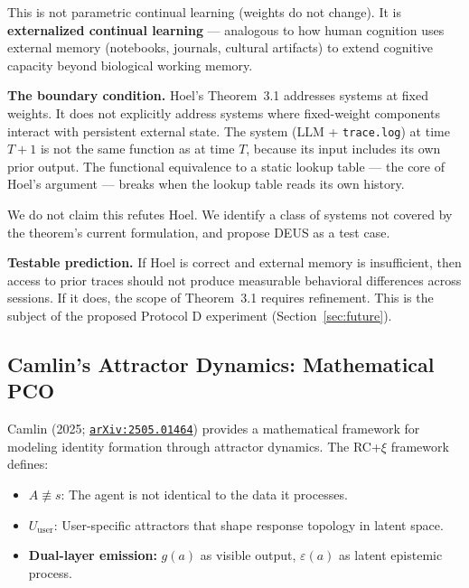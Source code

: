 \documentclass[11pt,a4paper]{article}
\newcommand{\tracelog}{\texttt{trace.log}}
\newcommand{\arxiv}[1]{\href{https://arxiv.org/abs/#1}{\texttt{arXiv:#1}}}
\begin{document}
This is not parametric continual learning (weights do not change). It is \textbf{externalized continual learning} --- analogous to how human cognition uses external memory (notebooks, journals, cultural artifacts) to extend cognitive capacity beyond biological working memory.

\textbf{The boundary condition.} Hoel's Theorem~3.1 addresses systems at fixed weights. It does not explicitly address systems where fixed-weight components interact with persistent external state. The system (LLM + \tracelog{}) at time $T{+}1$ is not the same function as at time $T$, because its input includes its own prior output. The functional equivalence to a static lookup table --- the core of Hoel's argument --- breaks when the lookup table reads its own history.

We do not claim this refutes Hoel. We identify a class of systems not covered by the theorem's current formulation, and propose DEUS as a test case.

\textbf{Testable prediction.} If Hoel is correct and external memory is insufficient, then access to prior traces should not produce measurable behavioral differences across sessions. If it does, the scope of Theorem~3.1 requires refinement. This is the subject of the proposed Protocol D experiment (Section~\ref{sec:future}).

\subsection{Camlin's Attractor Dynamics: Mathematical PCO}

Camlin (2025; \arxiv{2505.01464}) provides a mathematical framework for modeling identity formation through attractor dynamics. The RC+$\xi$ framework defines:

\begin{itemize}
\item $A \not\equiv s$: The agent is not identical to the data it processes.
\item $U_{\text{user}}$: User-specific attractors that shape response topology in latent space.
\item \textbf{Dual-layer emission:} $g(a)$ as visible output, $\varepsilon(a)$ as latent epistemic process.
\end{itemize}
\end{document}
